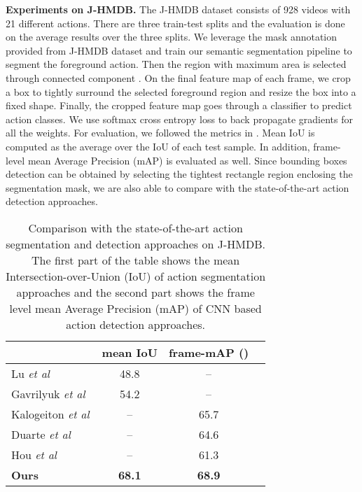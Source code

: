 \documentclass{bmvc2k}
\def\etal{\emph{et al}\bmvaOneDot}
\begin{document}
\textbf{Experiments on J-HMDB.}
The J-HMDB dataset consists of 928 videos with 21 different actions. There are three train-test splits and the evaluation is done on the average results over the three splits. We leverage the mask annotation provided from J-HMDB dataset and train our semantic segmentation pipeline to segment the foreground action. Then the region with maximum area is selected through connected component \cite{he2009fast}. On the final feature map of each frame, we crop a box to tightly surround the selected foreground region and resize the box into a fixed shape. Finally, the cropped feature map goes through a classifier to predict action classes. We use softmax cross entropy loss to back propagate gradients for all the weights. For evaluation, we followed the metrics in \cite{gavrilyuk2018actor}. Mean IoU is computed as the average over the IoU of each test sample. In addition, frame-level mean Average Precision (mAP) is evaluated as well. Since bounding boxes detection can be obtained by selecting the tightest rectangle region enclosing the segmentation mask, we are also able to compare with the state-of-the-art action detection approaches. 
\begin{table}[!htbp]
\centering
\small
\begin{tabular}{lccc}
\hline
                                                & mean IoU      & frame-mAP ()\\
\hline
Lu \etal~\cite{lu2015human}                     & 48.8          & -- \\
Gavrilyuk \etal~\cite{gavrilyuk2018actor}       & 54.2          & -- \\
\hline
Kalogeiton \etal \cite{kalogeiton2017action}    & --            & 65.7 \\
Duarte \etal \cite{duarte2018videocapsulenet}   & --            & 64.6 \\
Hou \etal \cite{hou2017tube}                    & --            & 61.3 \\
\hline
\textbf{Ours}                                   & \textbf{68.1} & \textbf{68.9} \\
\hline
\end{tabular}
\caption{Comparison with the state-of-the-art action segmentation and detection approaches on J-HMDB. The first part of the table shows the mean Intersection-over-Union (IoU) of action segmentation approaches and the second part shows the frame level mean Average Precision (mAP) of CNN based action detection approaches.}
\label{tab:jhmdb-segmentation}
\end{table}
\end{document}
